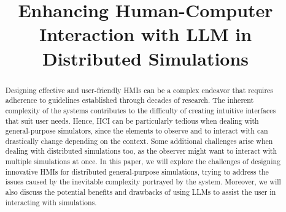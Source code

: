 \documentclass[conference]{IEEEtran}
\begin{document}
\title{Enhancing Human-Computer Interaction with LLM in Distributed Simulations\\
}

\author{
}

\maketitle

\begin{abstract}
    Designing effective and user-friendly \acp{HMI} can be a complex endeavor that requires adherence to guidelines
    established through decades of research.
    The inherent complexity of the systems contributes to the difficulty of creating intuitive interfaces that suit user needs.
    Hence,
    \ac{HCI} can be particularly tedious when dealing with general-purpose simulators,
    since the elements to observe and to interact with can drastically change depending on the context.
    Some additional challenges arise when dealing with distributed simulations too,
    as the observer might want to interact with multiple simulations at once.
    In this paper,
    we will explore the challenges of designing innovative \acp{HMI} for distributed general-purpose simulations,
    trying to address the issues caused by the inevitable complexity portrayed by the system.
    Moreover,
    we will also discuss the potential benefits and drawbacks of using \acp{LLM} to assist the user in interacting with simulations.
\end{abstract}

\end{document}
